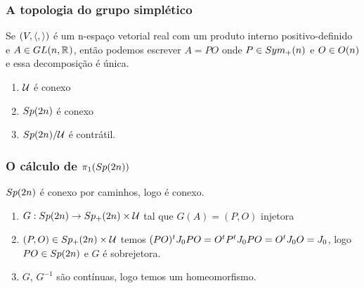\documentclass{beamer}
\begin{document}
	\begin{frame}
		\frametitle{A topologia do grupo simplético}
		
		\begin{teorema}
			Se $(V, \langle ,  \rangle)$ é um n-espaço vetorial real com um produto interno positivo-definido e $A \in GL(n, \mathbb{R}^{})$, então podemos escrever $A=PO$ onde $P \in  Sym_{+}(n)$ e $O \in O(n)$ e essa decomposição é única.
		\end{teorema}
		\begin{enumerate}
			\item $\mathcal{U}$ é conexo
			
			\item $Sp(2n)$ é conexo
			
			\item $Sp(2n)/\mathcal{U}$ é contrátil.
		\end{enumerate}
	\end{frame}
	
	\begin{frame}
		\frametitle{O cálculo de $\pi_{1}(Sp(2n))$}
		\begin{teorema}\label{teoerma_sp2n_conexo}
			$Sp(2n)$ é conexo por caminhos, logo é conexo.
		\end{teorema}
		
		\begin{prova}
			\begin{enumerate}
				\item $G: Sp(2n) \to Sp_{+}(2n) \times \mathcal{U}$ tal que $G(A) = (P,O)$ injetora
				
				\pause
				\item $(P,O) \in Sp_{+}(2n) \times \mathcal{U}$ temos $(PO)^{t}J_{0} PO = O^{t}P^{t}J_{0} PO = O^{t}J_{0} O = J_{0}$, logo $PO \in Sp(2n)$ e $G$ é sobrejetora.
				
				\pause
				\item $G$, $G^{-1}$ são contínuas, logo temos um homeomorfismo.
				
			\end{enumerate}
		\end{prova}
	\end{frame}
	
\end{document}
